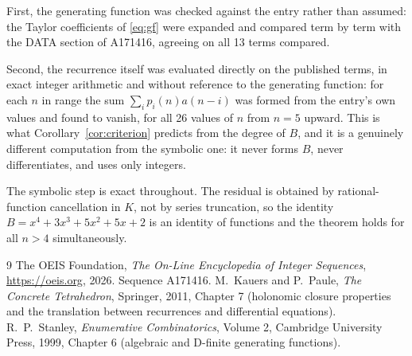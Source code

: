 \documentclass[11pt,a4paper]{article}
\theoremstyle{plain}
\theoremstyle{definition}
\begin{document}
First, the generating function was checked against the entry rather than assumed: the
Taylor coefficients of \eqref{eq:gf} were expanded and compared term by term with the DATA
section of A171416, agreeing on all 13 terms compared.

Second, the recurrence itself was evaluated directly on the published terms, in exact
integer arithmetic and without reference to the generating function: for each $n$ in range
the sum $\sum_{i}p_{i}(n)a(n-i)$ was formed from the entry's own values and found to
vanish, for all 26 values of $n$ from $n=5$ upward. This is what
Corollary~\ref{cor:criterion} predicts from the degree of $B$, and it is a genuinely
different computation from the symbolic one: it never forms $B$, never differentiates, and
uses only integers.

The symbolic step is exact throughout. The residual is obtained by rational-function
cancellation in $K$, not by series truncation, so the identity $B=x^{4} + 3 x^{3} + 5 x^{2} + 5 x + 2$ is an
identity of functions and the theorem holds for all $n>4$ simultaneously.

\begin{thebibliography}{9}
 The OEIS Foundation, \emph{The On-Line Encyclopedia of Integer Sequences},
\url{https://oeis.org}, 2026. Sequence A171416.
 M.~Kauers and P.~Paule, \emph{The Concrete Tetrahedron}, Springer, 2011,
Chapter 7 (holonomic closure properties and the translation between recurrences and
differential equations).
 R.~P.~Stanley, \emph{Enumerative Combinatorics}, Volume 2, Cambridge
University Press, 1999, Chapter 6 (algebraic and D-finite generating functions).
\end{thebibliography}
\end{document}
